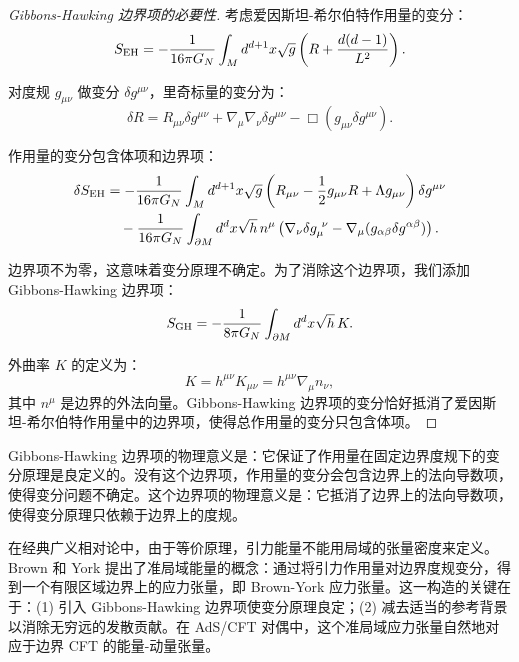 \begin{proof}[Gibbons-Hawking 边界项的必要性]
考虑爱因斯坦-希尔伯特作用量的变分：
\begin{equation}
    S_{\rm EH} = -\frac{1}{16\pi G_N} \int_M d^{d+1}x \sqrt{g} \left( R + \frac{d(d-1)}{L^2} \right).
\end{equation}

对度规 $g_{\mu\nu}$ 做变分 $\delta g^{\mu\nu}$，里奇标量的变分为：
\begin{equation}
    \delta R = R_{\mu\nu} \delta g^{\mu\nu} + \nabla_\mu \nabla_\nu \delta g^{\mu\nu} - \Box (g_{\mu\nu} \delta g^{\mu\nu}).
\end{equation}

作用量的变分包含体项和边界项：
\begin{align}
    \delta S_{\rm EH} &= -\frac{1}{16\pi G_N} \int_M d^{d+1}x \sqrt{g} \left( R_{\mu\nu} - \frac{1}{2}g_{\mu\nu} R + \Lambda g_{\mu\nu} \right) \delta g^{\mu\nu} \notag \\
    &\quad - \frac{1}{16\pi G_N} \int_{\partial M} d^d x \sqrt{h} \, n^\mu \left( \nabla_\nu \delta g_{\mu}^{\ \nu} - \nabla_\mu (g_{\alpha\beta} \delta g^{\alpha\beta}) \right).
\end{align}

边界项不为零，这意味着变分原理不确定。为了消除这个边界项，我们添加 Gibbons-Hawking 边界项：
\begin{equation}
    S_{\rm GH} = -\frac{1}{8\pi G_N} \int_{\partial M} d^d x \sqrt{h} \, K.
\end{equation}

外曲率 $K$ 的定义为：
\begin{equation}
    K = h^{\mu\nu} K_{\mu\nu} = h^{\mu\nu} \nabla_\mu n_\nu,
\end{equation}
其中 $n^\mu$ 是边界的外法向量。Gibbons-Hawking 边界项的变分恰好抵消了爱因斯坦-希尔伯特作用量中的边界项，使得总作用量的变分只包含体项。
\end{proof}

\begin{remark}[边界项的物理意义]
Gibbons-Hawking 边界项的物理意义是：它保证了作用量在固定边界度规下的变分原理是良定义的。没有这个边界项，作用量的变分会包含边界上的法向导数项，使得变分问题不确定。这个边界项的物理意义是：它抵消了边界上的法向导数项，使得变分原理只依赖于边界上的度规。
\end{remark}

\begin{note}
在经典广义相对论中，由于等价原理，引力能量不能用局域的张量密度来定义。Brown 和 York\cite{Brown1993} 提出了准局域能量的概念：通过将引力作用量对边界度规变分，得到一个有限区域边界上的应力张量，即 Brown-York 应力张量。这一构造的关键在于：(1) 引入 Gibbons-Hawking 边界项使变分原理良定；(2) 减去适当的参考背景以消除无穷远的发散贡献。在 AdS/CFT 对偶中，这个准局域应力张量自然地对应于边界 CFT 的能量-动量张量\cite{Balasubramanian1999}。
\end{note}

